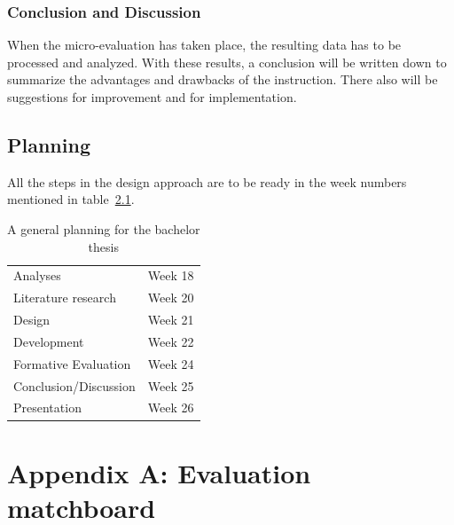 \documentclass[12pt]{report} %
\begin{document}
\section{Conclusion and Discussion}

When the micro-evaluation has taken place, the resulting data has to be processed and analyzed. With these results, a conclusion will be written down to summarize the advantages and drawbacks of the instruction. There also will be suggestions for improvement and for implementation.

\chapter{Planning}

All the steps in the design approach are to be ready in the week numbers mentioned in table~\ref{tab:planning}.

\begin{table}[h]
\begin{center}
\begin{tabular}{ l r }
Analyses & Week 18 \\
Literature research & Week 20 \\
Design & Week 21 \\
Development & Week 22 \\
Formative Evaluation & Week 24 \\
Conclusion/Discussion & Week 25 \\
Presentation & Week 26 \\
\end{tabular}
\end{center}
\caption{A general planning for the bachelor thesis \label{tab:planning}}
\end{table}




\part{Appendix A: Evaluation matchboard}


\end{document}
